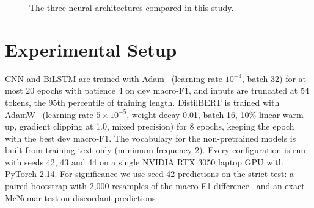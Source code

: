 \documentclass[conference]{IEEEtran}
\begin{document}
\begin{figure}[t]
\centering
{}
\caption{The three neural architectures compared in this study.}
\label{fig:models}
\end{figure}

\section{Experimental Setup}
CNN and BiLSTM are trained with Adam~\cite{kingma2015adam} (learning rate $10^{-3}$, batch 32) for at most 20 epochs with patience 4 on dev macro-F1, and inputs are truncated at 54 tokens, the 95th percentile of training length. DistilBERT is trained with AdamW~\cite{loshchilov2019adamw} (learning rate $5\times10^{-5}$, weight decay 0.01, batch 16, 10\% linear warm-up, gradient clipping at 1.0, mixed precision) for 8 epochs, keeping the epoch with the best dev macro-F1. The vocabulary for the non-pretrained models is built from training text only (minimum frequency 2). Every configuration is run with seeds 42, 43 and 44 on a single NVIDIA RTX 3050 laptop GPU with PyTorch 2.14. For significance we use seed-42 predictions on the strict test: a paired bootstrap with 2{,}000 resamples of the macro-F1 difference~\cite{efron1993bootstrap} and an exact McNemar test on discordant predictions~\cite{mcnemar1947,dietterich1998approximate}.
\end{document}
